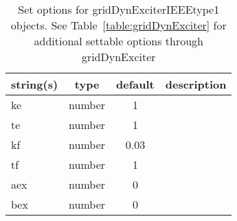 \begin{table}[ht]
\centering
\begin{tabular}{p{5cm} c c p{7cm}}
\hline
string(s) & type & default & description \\
\hline
ke & number & 1 & \\
te & number & 1 & \\
kf & number & 0.03 & \\
tf & number & 1 & \\
aex & number & 0 & \\
bex & number & 0 & \\
\hline
\end{tabular}
\caption{Set options for gridDynExciterIEEEtype1 objects. See Table~\ref{table:gridDynExciter} for additional settable options through gridDynExciter}
\label{table:gridDynExciterIEEEtype1}
\end{table}


